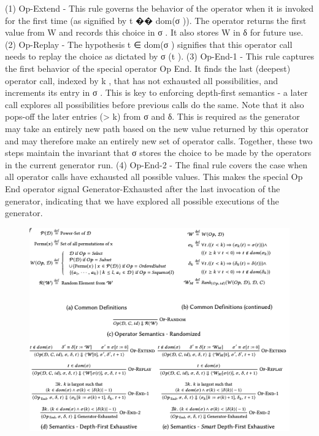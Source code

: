\documentclass{article}
\begin{document}
(1) Op-Extend - This rule governs the behavior of the operator when it is invoked for the first time (as signified by t �� dom(σ )). The operator returns the first value from W and records this choice in σ . It also stores W in δ for future use.
(2) Op-Replay - The hypothesis t ∈ dom(σ ) signifies that this operator call needs to replay the choice as dictated by σ (t ).
(3) Op-End-1 - This rule captures the first behavior of the special operator Op End. It finds the last (deepest) operator call, indexed by k , that has not exhausted all possibilities, and increments its entry in σ . This is key to enforcing depth-first semantics - a later call explores all possibilities before previous calls do the same. Note that it also pops-off the later entries (> k) from σ and δ. This is required as the generator may take an entirely new path based on the new value returned by this operator and may therefore make an entirely new set of operator calls. Together, these two steps maintain the invariant that σ stores the choice to be made by the operators in the current generator run.
(4) Op-End-2 - The final rule covers the case when all operator calls have exhausted all possible values. This makes the special Op End operator signal Generator-Exhausted after the last invocation of the generator, indicating that we have explored all possible executions of the generator.

\begin{figure}[ht]
\vskip 0.2in
\begin{center}
\centerline{\includegraphics[width=\columnwidth]{Images/Synthesis3-2.png}}
\label{icml-historical}
\end{center}
\vskip -0.2in
\end{figure}
\end{document}

